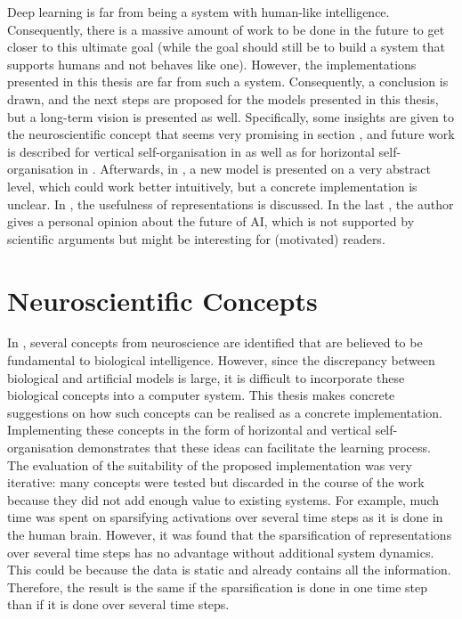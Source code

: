 
Deep learning is far from being a system with human-like intelligence. Consequently, there is a massive amount of work to be done in the future to get closer to this ultimate goal (while the goal should still be to build a system that supports humans and not behaves like one). However, the implementations presented in this thesis are far from such a system. Consequently, a conclusion is drawn, and the next steps are proposed for the models presented in this thesis, but a long-term vision is presented as well. Specifically, some insights are given to the neuroscientific concept that seems very promising in section , and future work is described for vertical self-organisation in  as well as for horizontal self-organisation in . Afterwards, in , a new model is presented on a very abstract level, which could work better intuitively, but a concrete implementation is unclear. In , the usefulness of representations is discussed. In the last , the author gives a personal opinion about the future of AI, which is not supported by scientific arguments but might be interesting for (motivated) readers.



\section{Neuroscientific Concepts}
In , several concepts from neuroscience are identified that are believed to be fundamental to biological intelligence. However, since the discrepancy between biological and artificial models is large, it is difficult to incorporate these biological concepts into a computer system. This thesis makes concrete suggestions on how such concepts can be realised as a concrete implementation. Implementing these concepts in the form of horizontal and vertical self-organisation demonstrates that these ideas can facilitate the learning process. The evaluation of the suitability of the proposed implementation was very iterative: many concepts were tested but discarded in the course of the work because they did not add enough value to existing systems. For example, much time was spent on sparsifying activations over several time steps as it is done in the human brain. However, it was found that the sparsification of representations over several time steps has no advantage without additional system dynamics. This could be because the data is static and already contains all the information. Therefore, the result is the same if the sparsification is done in one time step than if it is done over several time steps.

